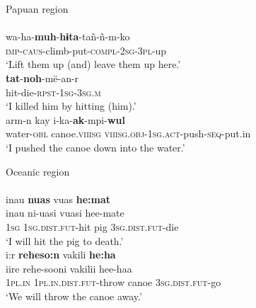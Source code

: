 \ea
Papuan region\\
\ea \label{Ala01}
\\
\gll wa-ha-\textbf{muh}-\textbf{hɨta}-tañ-ñ-m-ko\\
\textsc{imp}-\textsc{caus}-climb-put-\textsc{compl}-\textsc{2}\textsc{sg}-\textsc{3}\textsc{pl}-up\\
\glt ‘Lift them up (and) leave them up here.’
\ex \label{Ala02}
\\
\gll \textbf{tat}-\textbf{noh}-më-an-r\\
hit-die-\textsc{rpst}-\textsc{1}\textsc{sg}-\textsc{3}\textsc{sg}.\textsc{m}\\
\glt ‘I killed him by hitting (him).’
\ex \label{Yim01}
\\
\gll arm-n kay i-ka-\textbf{ak}-mpi-\textbf{wul}\\
water-\textsc{obl} canoe.\textsc{viiisg} \textsc{viiisg}.\textsc{obj}-\textsc{1}\textsc{sg}.\textsc{act}-push-\textsc{seq}-put.in\\
\glt ‘I pushed the canoe down into the water.’
\z
\z

\ea \label{Paa0001} 
Oceanic region\\
\ea \label{Paa01}
\\
\glll inau \textbf{nuas} vuas \textbf{he:mat} \\
inau ni-uasi vuasi hee-mate\\
\textsc{1}\textsc{sg} \textsc{1}\textsc{sg}.\textsc{dist}.\textsc{fut}-hit pig \textsc{3}\textsc{sg}.\textsc{dist}.\textsc{fut}-die\\
\glt ‘I will hit the pig to death.’
\ex \label{Paa02}
\\
\glll i:r \textbf{reheso:n} vakili \textbf{he:ha}\\
iire rehe-sooni vakilii hee-haa\\
\textsc{1}\textsc{pl}.\textsc{in} \textsc{1}\textsc{pl}.\textsc{in}.\textsc{dist}.\textsc{fut}-throw canoe \textsc{3}\textsc{sg}.\textsc{dist}.\textsc{fut}-go\\
\glt ‘We will throw the canoe away.’
\z
\z

